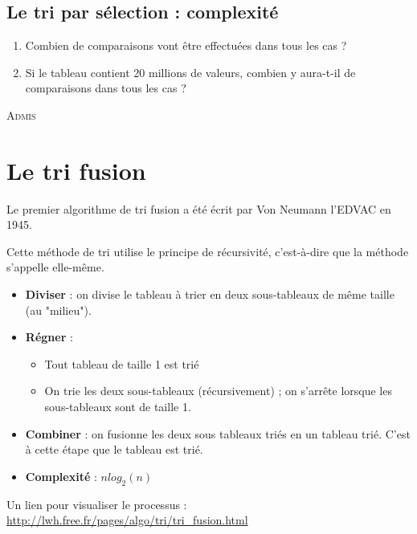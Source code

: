 \documentclass[a4paper,french]{article}
\begin{document}
{\subsection{Le tri par sélection : complexité}

\begin{enumerate}
\item Combien de comparaisons vont être effectuées dans tous les cas  ?
\\
\item Si le tableau contient 20 millions de valeurs, combien y aura-t-il de comparaisons dans tous les cas ?
\end{enumerate}
\bigskip

\textsc{Admis}
\\
\vspace*{8mm}

\section{Le tri fusion}

Le premier algorithme de tri fusion a été écrit par Von Neumann l'EDVAC en 1945. 
\medskip

Cette méthode de tri utilise le principe de récursivité, c'est-à-dire que la méthode s'appelle elle-même.

\begin{itemize}
\item \textbf{Diviser} : on divise le tableau à trier en deux sous-tableaux de même taille (au "milieu").

\item \textbf{Régner} : 
\begin{itemize}
\item Tout tableau de taille 1 est trié
\item On trie les deux sous-tableaux (récursivement) ; on s'arrête lorsque les sous-tableaux sont de taille 1.
\end{itemize}
 
\item \textbf{Combiner} :  
 on fusionne les deux sous tableaux triés en un tableau trié. C'est à cette étape que le tableau est trié.
 
 \item  \textbf{Complexité} :  $nlog_2(n)$
\end{itemize}
\medskip

Un lien pour visualiser le processus : \url{http://lwh.free.fr/pages/algo/tri/tri_fusion.html}
}
\end{document}
